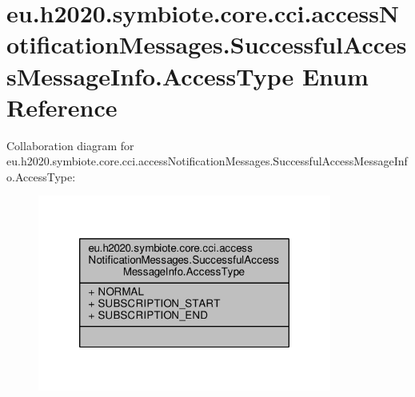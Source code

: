 \hypertarget{enumeu_1_1h2020_1_1symbiote_1_1core_1_1cci_1_1accessNotificationMessages_1_1SuccessfulAccessMessageInfo_1_1AccessType}{}\section{eu.\+h2020.\+symbiote.\+core.\+cci.\+access\+Notification\+Messages.\+Successful\+Access\+Message\+Info.\+Access\+Type Enum Reference}
\label{enumeu_1_1h2020_1_1symbiote_1_1core_1_1cci_1_1accessNotificationMessages_1_1SuccessfulAccessMessageInfo_1_1AccessType}


Collaboration diagram for eu.\+h2020.\+symbiote.\+core.\+cci.\+access\+Notification\+Messages.\+Successful\+Access\+Message\+Info.\+Access\+Type\+:\nopagebreak
\begin{figure}[H]
\begin{center}
\leavevmode
\includegraphics[width=274pt]{enumeu_1_1h2020_1_1symbiote_1_1core_1_1cci_1_1accessNotificationMessages_1_1SuccessfulAccessMess131562838eb77d3dc219d51d4199365b}
\end{center}
\end{figure}
